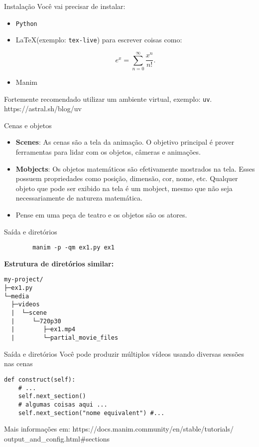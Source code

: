 \documentclass[14pt, aspectratio=169]{beamer}
\begin{document}
\begin{frame}{Instalação}
    Você vai precisar de instalar:
    \begin{itemize}
        \item \texttt{Python}
        \item \LaTeX (exemplo: \texttt{tex-live}) para escrever coisas como:

        \[e^x = \sum_{n=0}^\infty \frac{x^n}{n!}.\]
        
        \item Manim
    \end{itemize}
    Fortemente recomendado utilizar um ambiente virtual, exemplo: \texttt{uv}.
    https://astral.sh/blog/uv
\end{frame}

\begin{frame}{Cenas e objetos}
    \begin{itemize}
        \item<1->\textbf{Scenes}: As cenas são a tela da animação. O objetivo principal é prover ferramentas para lidar com os objetos, câmeras e animações.
        \item<2->\textbf{Mobjects}: Os objetos matemáticos são efetivamente mostrados na tela. Esses possuem propriedades como posição, dimensão, cor, nome, etc.
        Qualquer objeto que pode ser exibido na tela é um mobject, mesmo que não seja necessariamente de natureza matemática.
        \item <3->Pense em uma peça de teatro e os objetos são os atores.
    \end{itemize}
\end{frame}

\begin{frame}[fragile]{Saída e diretórios}
    \begin{verbatim}
        manim -p -qm ex1.py ex1
    \end{verbatim}
    \textbf{Estrutura de diretórios similar:}
\begin{verbatim}
my-project/
├─ex1.py
└─media
  ├─videos
  |  └─scene
  |     └─720p30
  |        ├─ex1.mp4
  |        └─partial_movie_files
    \end{verbatim}
\end{frame}

\begin{frame}[fragile]{Saída e diretórios}
    Você pode produzir múltiplos vídeos usando diversas sessões nas cenas
    \begin{verbatim}
def construct(self):
    # ...
    self.next_section()
    # algumas coisas aqui ...
    self.next_section("nome equivalent") #...
    \end{verbatim}
Mais informações em: {https://docs.manim.community/en/stable/tutorials/
output\_and\_config.html\#sections}
\end{frame}
\end{document}
